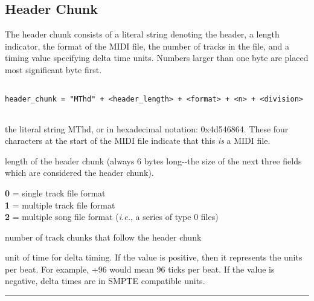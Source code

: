 \protect\hypertarget{header_chunk}{}{}

\hypertarget{header-chunk}{%
\subsection*{Header Chunk}\label{header-chunk}}

The header chunk consists of a literal string denoting the header, a
length indicator, the format of the MIDI file, the number of tracks in
the file, and a timing value specifying delta time units. Numbers larger
than one byte are placed most significant byte first.

\begin{verbatim}
 
header_chunk = "MThd" + <header_length> + <format> + <n> + <division>
 
\end{verbatim}

\begin{description}
\tightlist
\item[\textbf{\texttt{\ "MThd"}} 4 bytes]
the literal string MThd, or in hexadecimal notation: 0x4d546864. These
four characters at the start of the MIDI file indicate that this
\emph{is} a MIDI file.
\item[\textbf{\texttt{\textless{}header\_length\textgreater{}}} 4 bytes]
length of the header chunk (always 6 bytes long-\/-the size of the next
three fields which are considered the header chunk).
\item[\textbf{\texttt{\textless{}format\textgreater{}}} 2 bytes]
\textbf{0} = single track file format\\
\textbf{1} = multiple track file format\\
\textbf{2} = multiple song file format (\emph{i.e.}, a series of type 0
files)
\item[\textbf{\texttt{\textless{}n\textgreater{}}} 2 bytes]
number of track chunks that follow the header chunk
\item[\textbf{\texttt{\textless{}division\textgreater{}}} 2 bytes]
unit of time for delta timing. If the value is positive, then it
represents the units per beat. For example, +96 would mean 96 ticks per
beat. If the value is negative, delta times are in SMPTE compatible
units.
\end{description}

\begin{center}\rule{0.5\linewidth}{0.5pt}\end{center}

